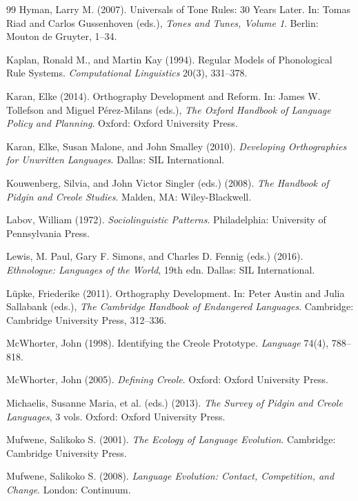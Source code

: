 \documentclass[12pt]{article}
\begin{document}
\begin{thebibliography}{99}
Hyman, Larry M. (2007).
Universals of Tone Rules: 30 Years Later.
In: Tomas Riad and Carlos Gussenhoven (eds.),
\textit{Tones and Tunes, Volume 1}.
Berlin: Mouton de Gruyter, 1--34.

Kaplan, Ronald M., and Martin Kay (1994).
Regular Models of Phonological Rule Systems.
\textit{Computational Linguistics} 20(3), 331--378.

Karan, Elke (2014).
Orthography Development and Reform.
In: James W. Tollefson and Miguel Pérez-Milans (eds.),
\textit{The Oxford Handbook of Language Policy and Planning}.
Oxford: Oxford University Press.

Karan, Elke, Susan Malone, and John Smalley (2010).
\textit{Developing Orthographies for Unwritten Languages}.
Dallas: SIL International.

Kouwenberg, Silvia, and John Victor Singler (eds.) (2008).
\textit{The Handbook of Pidgin and Creole Studies}.
Malden, MA: Wiley-Blackwell.

Labov, William (1972).
\textit{Sociolinguistic Patterns}.
Philadelphia: University of Pennsylvania Press.

Lewis, M. Paul, Gary F. Simons, and Charles D. Fennig (eds.) (2016).
\textit{Ethnologue: Languages of the World}, 19th edn.
Dallas: SIL International.

Lüpke, Friederike (2011).
Orthography Development.
In: Peter Austin and Julia Sallabank (eds.),
\textit{The Cambridge Handbook of Endangered Languages}.
Cambridge: Cambridge University Press, 312--336.

McWhorter, John (1998).
Identifying the Creole Prototype.
\textit{Language} 74(4), 788--818.

McWhorter, John (2005).
\textit{Defining Creole}.
Oxford: Oxford University Press.

Michaelis, Susanne Maria, et al. (eds.) (2013).
\textit{The Survey of Pidgin and Creole Languages}, 3 vols.
Oxford: Oxford University Press.

Mufwene, Salikoko S. (2001).
\textit{The Ecology of Language Evolution}.
Cambridge: Cambridge University Press.

Mufwene, Salikoko S. (2008).
\textit{Language Evolution: Contact, Competition, and Change}.
London: Continuum.


\end{thebibliography}
\end{document}
